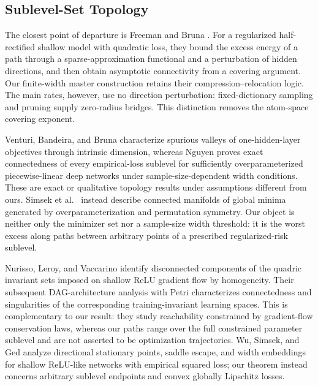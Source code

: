 \documentclass[smallextended,envcountsect]{svjour3}
\begin{document}
\subsection{Sublevel-Set Topology}\label{sec:related}
The closest point of departure is Freeman and Bruna \cite{FreemanBruna2017}. For a regularized half-rectified shallow model with quadratic loss, they bound the excess energy of a path through a sparse-approximation functional and a perturbation of hidden directions, and then obtain asymptotic connectivity from a covering argument. Our finite-width master construction retains their compression--relocation logic. The main rates, however, use no direction perturbation: fixed-dictionary sampling and pruning supply zero-radius bridges. This distinction removes the atom-space covering exponent.

Venturi, Bandeira, and Bruna \cite{Venturi2019} characterize spurious valleys of one-hidden-layer objectives through intrinsic dimension, whereas Nguyen \cite{Nguyen2019} proves exact connectedness of every empirical-loss sublevel for sufficiently overparameterized piecewise-linear deep networks under sample-size-dependent width conditions. These are exact or qualitative topology results under assumptions different from ours. Simsek et al.\ \cite{Simsek2021} instead describe connected manifolds of global minima generated by overparameterization and permutation symmetry. Our object is neither only the minimizer set nor a sample-size width threshold: it is the worst excess along paths between arbitrary points of a prescribed regularized-risk sublevel.

Nurisso, Leroy, and Vaccarino \cite{Nurisso2024} identify disconnected components of the quadric invariant sets imposed on shallow ReLU gradient flow by homogeneity. Their subsequent DAG-architecture analysis with Petri \cite{Nurisso2026} characterizes connectedness and singularities of the corresponding training-invariant learning spaces. This is complementary to our result: they study reachability constrained by gradient-flow conservation laws, whereas our paths range over the full constrained parameter sublevel and are not asserted to be optimization trajectories. Wu, Simsek, and Ged \cite{Wu2025} analyze directional stationary points, saddle escape, and width embeddings for shallow ReLU-like networks with empirical squared loss; our theorem instead concerns arbitrary sublevel endpoints and convex globally Lipschitz losses.
\end{document}
